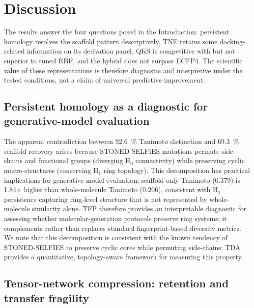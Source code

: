 \documentclass[11pt,a4paper]{article}
\begin{document}

\section{Discussion}

The results answer the four questions posed in the Introduction: persistent homology resolves the scaffold pattern descriptively, TNE retains some docking-related information on its derivation panel, QKS is competitive with but not superior to tuned RBF, and the hybrid does not surpass ECFP4. The scientific value of these representations is therefore diagnostic and interpretive under the tested conditions, not a claim of universal predictive improvement.

\subsection{Persistent homology as a diagnostic for generative-model evaluation}

The apparent contradiction between \qty{92.6}{\percent} Tanimoto distinction and \qty{69.3}{\percent} scaffold recovery arises because STONED-SELFIES mutations permute side-chains and functional groups (diverging H$_0$ connectivity) while preserving cyclic macro-structures (conserving H$_1$ ring topology). This decomposition has practical implications for generative-model evaluation: scaffold-only Tanimoto (\num{0.379}) is \num{1.84}$\times$ higher than whole-molecule Tanimoto (\num{0.206}), consistent with H$_1$ persistence capturing ring-level structure that is not represented by whole-molecule similarity alone. TFP therefore provides an interpretable diagnostic for assessing whether molecular-generation protocols preserve ring systems; it complements rather than replaces standard fingerprint-based diversity metrics. We note that this decomposition is consistent with the known tendency of STONED-SELFIES to preserve cyclic cores while permuting side-chains; TDA provides a quantitative, topology-aware framework for measuring this property.

\subsection{Tensor-network compression: retention and transfer fragility}
\end{document}
